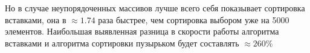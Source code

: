 \documentclass[12pt]{report}
\begin{document}
Но в случае неупорядоченных массивов лучше всего себя показывает сортировка вставками, она в $\approx 1.74$ раза быстрее, чем сортировка выбором уже на 5000 элементов. Наибольшая выявленная разница в скорости работы алгоритма вставками и алгоритма сортировки пузырьком будет составлять $\approx 260\%$

\end{document}
